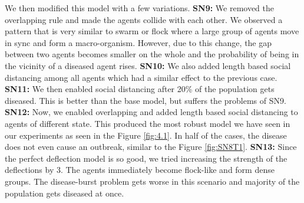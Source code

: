 \documentclass[a4paper,11pt]{article}
\begin{document}
    We then modified this model with a few variations.
    \textbf{SN9:} We removed the overlapping rule and made the agents collide with each other.
    We observed a pattern that is very similar to swarm or flock where a large group of agents move in sync and form a macro-organism.
    However, due to this change, the gap between two agents becomes smaller on the whole and the probability of being in the vicinity of a diseased agent rises.
    \textbf{SN10:} We also added length based social distancing among all agents which had a similar effect to the previous case.
    \textbf{SN11:} We then enabled social distancing after 20\% of the population gets diseased\cite{3b1b}.
    This is better than the base model, but suffers the problems of SN9.
    \textbf{SN12:} Now, we enabled overlapping and added length based social distancing to agents of different state.
    This produced the most robust model we have seen in our experiments as seen in the Figure \ref{fig:4.1}.
    In half of the cases, the disease does not even cause an outbreak, similar to the Figure \ref{fig:SN8T1}.
    \textbf{SN13:} Since the perfect deflection model is so good, we tried increasing the strength of the deflections by 3.
    The agents immediately become flock-like and form dense groups.
    The disease-burst problem gets worse in this scenario and majority of the population gets diseased at once.
\end{document}
